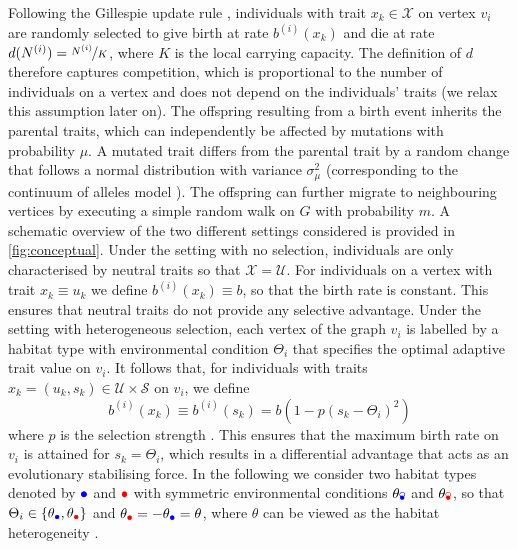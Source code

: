 Following the Gillespie update rule \cite{Gillespie1976}, individuals with trait $x_k \in \mathcal{X}$ on vertex $v_i$ are randomly selected to give birth at rate $b^{(i)}(x_k)$ and die at rate $d(N^{(i)}) = \nicefrac{N^{(i)}}{K}$, where $K$ is the local carrying capacity. 
% 
The definition of $d$ therefore captures competition, which is proportional to the number of individuals on a vertex and does not depend on the individuals' traits (we relax this assumption later on).
%
The offspring resulting from a birth event inherits the parental traits, which can independently be affected by mutations with probability $\mu$. A mutated trait differs from the parental trait by a random change that follows a normal distribution with variance $\sigma_\mu^2$ (corresponding to the continuum of alleles model \cite{Kimura1964}). The offspring can further migrate to neighbouring vertices by executing a simple random walk on $G$ with probability $m$.
%
A schematic overview of the two different settings considered is provided in \cref{fig:conceptual}. Under the setting with no selection, individuals are only characterised by neutral traits so that $\mathcal{X} = \mathcal{U}$.
%
For individuals on a vertex with trait $x_k\equiv u_k$ we define $b^{(i)}(x_k) \equiv b$, so that the birth rate is constant. This ensures that neutral traits do not provide any selective advantage.
%
Under the setting with heterogeneous selection, each vertex of the graph $v_i$ is labelled by a habitat type with environmental condition $\Theta_i$ that specifies the optimal adaptive trait value on $v_i$. It follows that, for individuals with traits $x_k = (u_k,s_k) \in \mathcal{U}\times \mathcal{S}$ on $v_i$, we define 
\begin{equation} \label{eq:birth_fun}
 b^{(i)}(x_k) \equiv b^{(i)}(s_k) = b(1 - p(s_k - \Theta_i)^2)
\end{equation}
%
where $p$ is the selection strength \cite{Mirrahimi2020}. This ensures that the maximum birth rate on $v_i$ is attained for $s_k = \Theta_i$, which results in a differential advantage that acts as an evolutionary stabilising force. In the following we consider two habitat types denoted by $\bcirc$ and $\rcirc$ with symmetric environmental conditions $\theta_\bcirc$ and $\theta_\rcirc$, so that $\Theta_i \in \{\theta_{\bcirc},\theta_{\rcirc}\}$ and $\theta_{\rcirc} = -\theta_{\bcirc} = \theta$, where $\theta$ can be viewed as the habitat heterogeneity \cite{Mirrahimi2020}.


